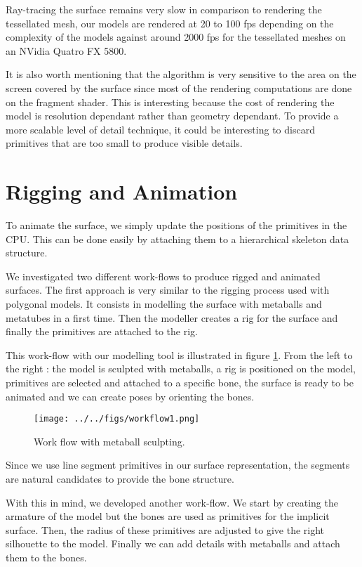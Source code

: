 \documentclass[annual]{acmsiggraph}
\begin{document}
Ray-tracing the surface remains very slow in comparison to rendering the tessellated mesh, our models are rendered at 20 to 100 fps depending on the complexity of the models against around 2000 fps for the tessellated meshes on an NVidia Quatro FX 5800.

It is also worth mentioning that the algorithm is very sensitive to the area on the screen covered by the surface since most of the rendering computations are done on the fragment shader. This is interesting because the cost of rendering the model is resolution dependant rather than geometry dependant. To provide a more scalable level of detail technique, it could be interesting to discard primitives that are too small to produce visible details.


\section{Rigging and Animation}

To animate the surface, we simply update the positions of the primitives in the CPU. This can be done easily by attaching them to a hierarchical skeleton data structure.

We investigated two different work-flows to produce rigged and animated surfaces.
The first approach is very similar to the rigging process used with polygonal models. It consists in modelling the surface with metaballs and metatubes in a first time. Then the modeller creates a rig for the surface and finally the primitives are attached to the rig.

This work-flow with our modelling tool is illustrated in figure \ref{workflow1}.
From the left to the right : the model is sculpted with metaballs, a rig is positioned on the model, primitives are selected and attached to a specific bone, the surface is ready to be animated and we can create poses by orienting the bones.

\begin{figure}[ht]
  \centering
  \texttt{[image: ../../figs/workflow1.png]}
  \caption{Work flow with metaball sculpting.}
  \label{workflow1}
\end{figure}

Since we use line  segment primitives in our surface representation, the segments are natural candidates to provide the bone structure.

With this in mind, we developed another work-flow.
We start by creating the armature of the model but the bones are used as primitives for the implicit surface.
Then, the radius of these primitives are adjusted to give the right silhouette to the model. Finally we can add details with metaballs and attach them to the bones.
\end{document}
